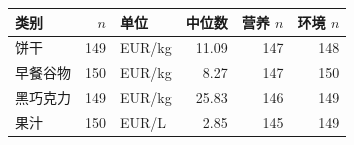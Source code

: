 \begin{tabular}{lrlrrr}
\toprule
类别 & $n$ & 单位 & 中位数 & 营养 $n$ & 环境 $n$ \\
\midrule
饼干 & 149 & EUR/kg & 11.09 & 147 & 148 \\
早餐谷物 & 150 & EUR/kg & 8.27 & 147 & 150 \\
黑巧克力 & 149 & EUR/kg & 25.83 & 146 & 149 \\
果汁 & 150 & EUR/L & 2.85 & 145 & 149 \\
\bottomrule
\end{tabular}

